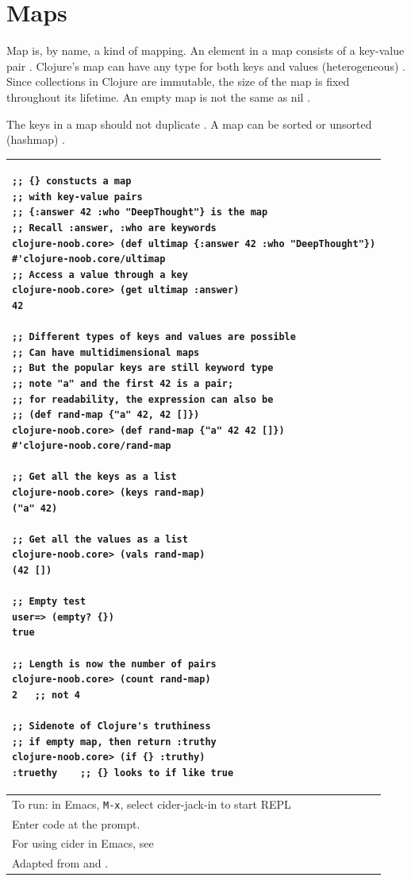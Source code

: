 \documentclass[12pt]{article}
\begin{document}
\part{Maps}

Map is, by name, a kind of mapping. An element in a map consists of a key-value pair \cite{fogus2014joy}. Clojure's map can have any type for both keys and values (heterogeneous) \cite{fogus2014joy}.
Since collections in Clojure are immutable, the size of the map is fixed throughout its lifetime. An empty map is not the same as nil \cite{fogus2014joy}.

The keys in a map should not duplicate \cite{rathore2011clojure}. A map can be sorted or unsorted (hashmap) \cite{rathore2011clojure}.

\begin{tabular}{|p{\textwidth}|}
\hline
\begin{verbatim}
;; {} constucts a map
;; with key-value pairs
;; {:answer 42 :who "DeepThought"} is the map
;; Recall :answer, :who are keywords
clojure-noob.core> (def ultimap {:answer 42 :who "DeepThought"})
#'clojure-noob.core/ultimap
;; Access a value through a key
clojure-noob.core> (get ultimap :answer)
42

;; Different types of keys and values are possible
;; Can have multidimensional maps
;; But the popular keys are still keyword type
;; note "a" and the first 42 is a pair;
;; for readability, the expression can also be
;; (def rand-map {"a" 42, 42 []})
clojure-noob.core> (def rand-map {"a" 42 42 []})
#'clojure-noob.core/rand-map

;; Get all the keys as a list
clojure-noob.core> (keys rand-map)
("a" 42)

;; Get all the values as a list
clojure-noob.core> (vals rand-map)
(42 [])

;; Empty test
user=> (empty? {})
true

;; Length is now the number of pairs
clojure-noob.core> (count rand-map)
2   ;; not 4

;; Sidenote of Clojure's truthiness
;; if empty map, then return :truthy
clojure-noob.core> (if {} :truthy)
:truethy    ;; {} looks to if like true
\end{verbatim}
\\
\hline
To run: in Emacs, \texttt{M-x}, select cider-jack-in to start REPL\\
Enter code at the prompt.\\
For using cider in Emacs, see \cite{brave2015}\\
\hline
Adapted from \cite{fogus2014joy} and \cite{empty}.\\
\hline
\end{tabular}
\end{document}
